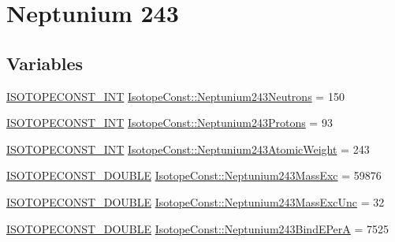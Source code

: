 \hypertarget{group___isotope_const-_neptunium-_np243}{}\section{Neptunium 243}
\label{group___isotope_const-_neptunium-_np243}
\subsection*{Variables}
\begin{DoxyCompactItemize}
\item 
\mbox{\hyperlink{group___isotope_const-_macros_ga5f18360b3e99483a35c32d789e62621c}{I\+S\+O\+T\+O\+P\+E\+C\+O\+N\+S\+T\+\_\+\+I\+NT}} \mbox{\hyperlink{group___isotope_const-_neptunium-_np243_gab67441dfaa0664ad3c9c5127a55402e2}{Isotope\+Const\+::\+Neptunium243\+Neutrons}} = 150
\item 
\mbox{\hyperlink{group___isotope_const-_macros_ga5f18360b3e99483a35c32d789e62621c}{I\+S\+O\+T\+O\+P\+E\+C\+O\+N\+S\+T\+\_\+\+I\+NT}} \mbox{\hyperlink{group___isotope_const-_neptunium-_np243_ga0a34100f74cb1294c852ee8430588ea0}{Isotope\+Const\+::\+Neptunium243\+Protons}} = 93
\item 
\mbox{\hyperlink{group___isotope_const-_macros_ga5f18360b3e99483a35c32d789e62621c}{I\+S\+O\+T\+O\+P\+E\+C\+O\+N\+S\+T\+\_\+\+I\+NT}} \mbox{\hyperlink{group___isotope_const-_neptunium-_np243_ga52a01ea4b744ec2cc512d9db28e7d331}{Isotope\+Const\+::\+Neptunium243\+Atomic\+Weight}} = 243
\item 
\mbox{\hyperlink{group___isotope_const-_macros_ga8f45a7272ce02c0b4c65c44636ed719a}{I\+S\+O\+T\+O\+P\+E\+C\+O\+N\+S\+T\+\_\+\+D\+O\+U\+B\+LE}} \mbox{\hyperlink{group___isotope_const-_neptunium-_np243_gaf76927dd805144b1bdd1de832ce816ef}{Isotope\+Const\+::\+Neptunium243\+Mass\+Exc}} = 59876
\item 
\mbox{\hyperlink{group___isotope_const-_macros_ga8f45a7272ce02c0b4c65c44636ed719a}{I\+S\+O\+T\+O\+P\+E\+C\+O\+N\+S\+T\+\_\+\+D\+O\+U\+B\+LE}} \mbox{\hyperlink{group___isotope_const-_neptunium-_np243_ga6426fcd2a44238b4c86ba8fb218e9111}{Isotope\+Const\+::\+Neptunium243\+Mass\+Exc\+Unc}} = 32
\item 
\mbox{\hyperlink{group___isotope_const-_macros_ga8f45a7272ce02c0b4c65c44636ed719a}{I\+S\+O\+T\+O\+P\+E\+C\+O\+N\+S\+T\+\_\+\+D\+O\+U\+B\+LE}} \mbox{\hyperlink{group___isotope_const-_neptunium-_np243_ga63dcfcd671aa67ab3b5327bc0c1b11e8}{Isotope\+Const\+::\+Neptunium243\+Bind\+E\+PerA}} = 7525
\item 

\end{DoxyCompactItemize}
